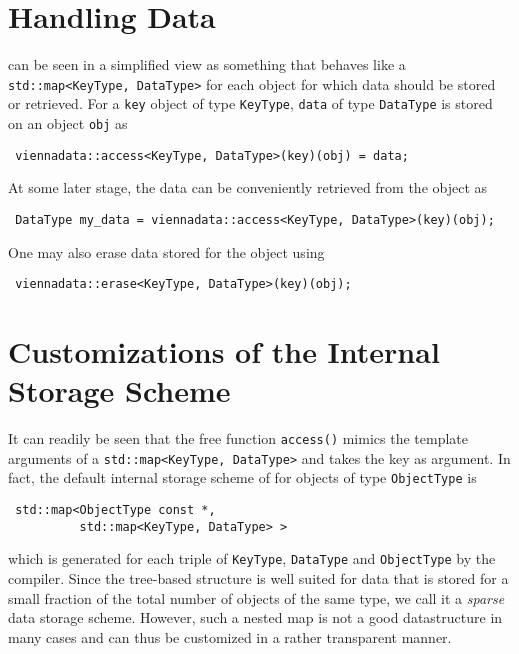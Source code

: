 \section{Handling Data}
{\ViennaData} can be seen in a simplified view as something that behaves like a \lstinline|std::map<KeyType, DataType>| for each object for which data should be stored or retrieved. For a \lstinline|key| object of type \lstinline|KeyType|, \lstinline|data| of type \lstinline|DataType| is stored on an object \lstinline|obj| as
\begin{lstlisting}
 viennadata::access<KeyType, DataType>(key)(obj) = data;
\end{lstlisting}
At some later stage, the data can be conveniently retrieved from the object as
\begin{lstlisting}
 DataType my_data = viennadata::access<KeyType, DataType>(key)(obj);
\end{lstlisting}
One may also erase data stored for the object using
\begin{lstlisting}
 viennadata::erase<KeyType, DataType>(key)(obj);
\end{lstlisting}

\section{Customizations of the Internal Storage Scheme}
It can readily be seen that the free function \lstinline|access()| mimics the template arguments of a \lstinline|std::map<KeyType, DataType>| and takes the key as argument. In fact, the default internal storage scheme of {\ViennaData} for objects of type \lstinline|ObjectType| is 
\begin{lstlisting}
 std::map<ObjectType const *,
          std::map<KeyType, DataType> >
\end{lstlisting}
which is generated for each triple of \lstinline|KeyType|, \lstinline|DataType| and \lstinline|ObjectType| by the compiler.
Since the tree-based structure is well suited for data that is stored for a small fraction of the total number of objects of the same type, we call it a \emph{sparse} data storage scheme. However, such a nested map is not a good datastructure in many cases and can thus be customized in a rather transparent manner.

